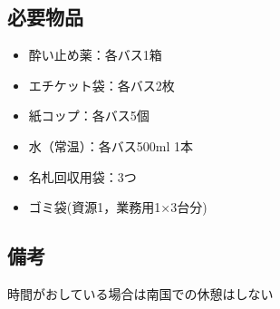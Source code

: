 \newpage

\subsection{必要物品}
\begin{itemize}
\item 酔い止め薬：各バス1箱
\item エチケット袋：各バス2枚
\item 紙コップ：各バス5個
\item 水（常温）：各バス500ml 1本
\item 名札回収用袋：3つ
\item ゴミ袋(資源1，業務用1×3台分)
\end{itemize}


\subsection{備考}
\item 時間がおしている場合は南国での休憩はしない

%
